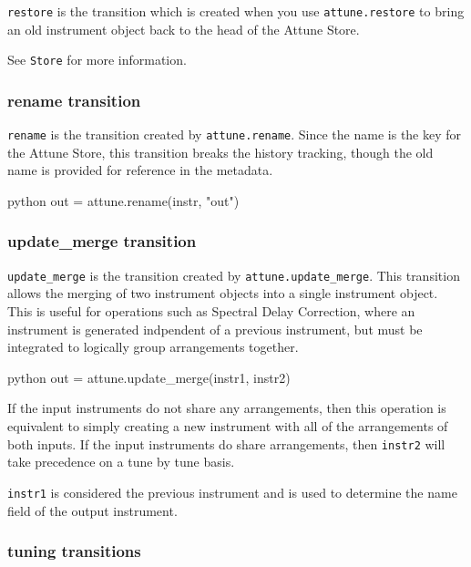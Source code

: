 \texttt{restore} is the transition which is created when you use
\texttt{attune.restore} to bring an old instrument object back to the
head of the Attune Store.

See \texttt{Store} for more information.

\hypertarget{rename-transition}{%
\subsubsection{rename transition}\label{rename-transition}}

\texttt{rename} is the transition created by \texttt{attune.rename}.
Since the name is the key for the Attune Store, this transition breaks
the history tracking, though the old name is provided for reference in
the metadata.

\begin{codefragment}{python}
out = attune.rename(instr, "out")
\end{codefragment}

\hypertarget{update_merge-transition}{%
\subsubsection{update\_merge transition}\label{update_merge-transition}}

\texttt{update\_merge} is the transition created by
\texttt{attune.update\_merge}. This transition allows the merging of two
instrument objects into a single instrument object. This is useful for
operations such as Spectral Delay Correction, where an instrument is
generated indpendent of a previous instrument, but must be integrated to
logically group arrangements together.

\begin{codefragment}{python}
out = attune.update_merge(instr1, instr2)
\end{codefragment}

If the input instruments do not share any arrangements, then this
operation is equivalent to simply creating a new instrument with all of
the arrangements of both inputs. If the input instruments do share
arrangements, then \texttt{instr2} will take precedence on a tune by
tune basis.

\texttt{instr1} is considered the previous instrument and is used to
determine the name field of the output instrument.

\hypertarget{tuning-transitions}{%
\subsubsection{tuning transitions}\label{tuning-transitions}}

